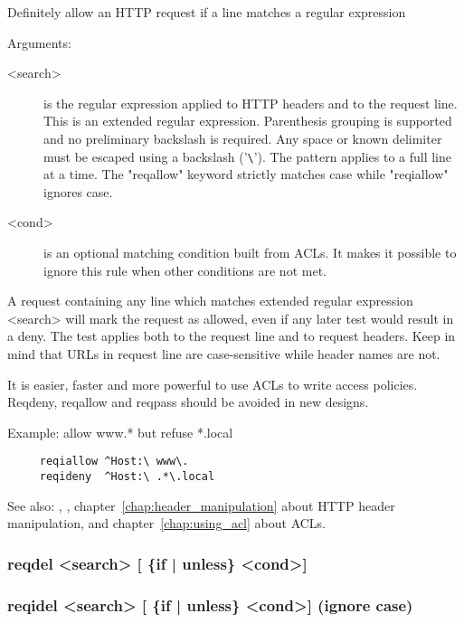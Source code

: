 {

  Definitely allow an HTTP request if a line matches a regular expression


  Arguments:

\begin{description}
\item[<search>] is the regular expression applied to HTTP headers and to the
              request line. This is an extended regular expression. Parenthesis
              grouping is supported and no preliminary backslash is required.
              Any space or known delimiter must be escaped using a backslash
              ('\verb|\|'). The pattern applies to a full line at a time. The
              "reqallow" keyword strictly matches case while "reqiallow"
              ignores case.

\item[<cond>] is an optional matching condition built from ACLs. It makes it
              possible to ignore this rule when other conditions are not met.
\end{description}

  A request containing any line which matches extended regular expression
  <search> will mark the request as allowed, even if any later test would
  result in a deny. The test applies both to the request line and to request
  headers. Keep in mind that URLs in request line are case-sensitive while
  header names are not.

  It is easier, faster and more powerful to use ACLs to write access policies.
  Reqdeny, reqallow and reqpass should be avoided in new designs.

  Example: allow www.* but refuse *.local
\begin{verbatim}
     reqiallow ^Host:\ www\.
     reqideny  ^Host:\ .*\.local
\end{verbatim}

  See also: , , chapter~\ref{chap:header_manipulation} about HTTP header manipulation, and
            chapter~\ref{chap:using_acl} about ACLs.

\subsubsection[reqdel]{reqdel  <search> [ \{if | unless\} <cond>]}
\subsubsection[reqidel]{reqidel <search> [ \{if | unless\} <cond>]  (ignore case)}

}
